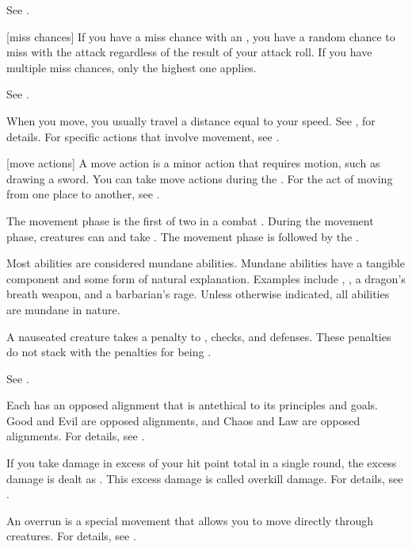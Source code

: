  See .

[miss chances] If you have a miss chance with an , you have a random chance to miss with the attack regardless of the result of your attack roll.
If you have multiple miss chances, only the highest one applies.

 See .

 When you move, you usually travel a distance equal to your speed.
See , for details.
For specific actions that involve movement, see .

[move actions] A move action is a minor action that requires motion, such as drawing a sword.
You can take move actions during the .
For the act of moving from one place to another, see .

 The movement phase is the first of two  in a combat .
During the movement phase, creatures can  and take .
The movement phase is followed by the .

 Most abilities are considered mundane abilities.
Mundane abilities have a tangible component and some form of natural explanation.
Examples include , , a dragon's breath weapon, and a barbarian's rage.
Unless otherwise indicated, all abilities are mundane in nature.

 A nauseated creature takes a  penalty to , checks, and defenses.
These penalties do not stack with the penalties for being \sickened.

 See .

 Each  has an opposed alignment that is antethical to its principles and goals.
Good and Evil are opposed alignments, and Chaos and Law are opposed alignments.
For details, see .

 If you take damage in excess of your  hit point total in a single round, the excess damage is dealt as .
This excess damage is called overkill damage.
For details, see .

 An overrun is a special movement that allows you to move directly through creatures.
For details, see .

